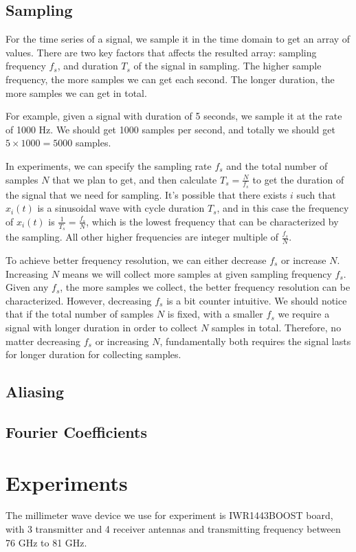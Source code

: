 \documentclass[11pt, oneside]{article}   	%
\begin{document}
\subsection{Sampling}
For the time series of a signal, we sample it in the time domain to get an array of values. There are two key factors that affects the resulted array: sampling frequency $f_s$, and duration $T_s$ of the signal in sampling. The higher sample frequency, the more samples we can get each second. The longer duration, the more samples we can get in total.

For example, given a signal with duration of 5 seconds, we sample it at the rate of 1000 Hz. We should get 1000 samples per second, and totally we should get $5\times 1000 = 5000$ samples.

In experiments, we can specify the sampling rate $f_s$ and the total number of samples $N$ that we plan to get, and then calculate $T_s = \frac{N}{f_s}$ to get the duration of the signal that we need for sampling. It's possible that there exists $i$ such that $x_i(t)$ is a sinusoidal wave with cycle duration $T_s$, and in this case the frequency of $x_i(t)$ is $\frac{1}{T_s} = \frac{f_s}{N}$, which is the lowest frequency that can be characterized by the sampling. All other higher frequencies are integer multiple of $\frac{f_s}{N}.$

To achieve better frequency resolution, we can either decrease $f_s$ or increase $N$. Increasing $N$ means we will collect more samples at given sampling frequency $f_s$. Given any $f_s$, the more samples we collect, the better frequency resolution can be characterized. However, decreasing $f_s$ is a bit counter intuitive. We should notice that if the total number of samples $N$ is fixed, with a smaller $f_s$ we require a signal with longer duration in order to collect $N$ samples in total. Therefore, no matter decreasing $f_s$ or  increasing $N$, fundamentally both requires the signal lasts for longer duration for collecting samples.

\subsection{Aliasing}
\subsection{Fourier Coefficients}



\section{Experiments}
The millimeter wave device we use for experiment is IWR1443BOOST board, with 3 transmitter and 4 receiver antennas and transmitting frequency between 76 GHz to 81 GHz.
\end{document}
